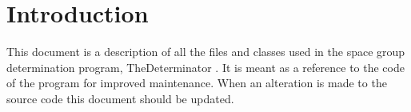 \section{Introduction}
This document is a description of all the files and classes used in the space group determination program, TheDeterminator . It is meant as a reference to the code of the program for improved maintenance. When an alteration is made to the source code this document should be updated.
